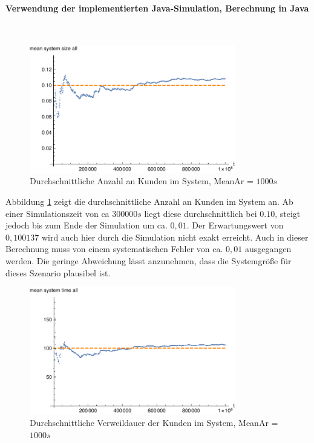 \paragraph{Verwendung der implementierten Java-Simulation, Berechnung in Java}
\label{JavaTwoPhones1000}
\\
\begin{figure}[htpb]
	\centering
	\includegraphics[width=0.8\textwidth]{abbildungen/2_Phone_VIP/Arrival_1000_Serve_100_dur_1000000_Skip_0/MeanSystemSizeAll.pdf}
	\caption{Durchschnittliche Anzahl an Kunden im System, MeanAr = $1000s$}
	\label{fig:mean3SystemSize1000}
\end{figure}

Abbildung \ref{fig:mean3SystemSize1000} zeigt die durchschnittliche Anzahl an Kunden im System an. Ab einer Simulationszeit von ca $300000s$ liegt diese durchschnittlich bei $0.10$, steigt jedoch bis zum Ende der Simulation um ca. $0,01$. Der Erwartungswert von $0,100137$ wird auch hier durch die Simulation nicht exakt erreicht. Auch in dieser Berechnung muss von einem systematischen Fehler von ca. $0,01$ ausgegangen werden. Die geringe Abweichung lässt anzunehmen, dass die Systemgröße für dieses Szenario plausibel ist.

\begin{figure}[htpb]
	\centering
	\includegraphics[width=0.8\textwidth]{abbildungen/2_Phone_VIP/Arrival_1000_Serve_100_dur_1000000_Skip_0/MeanSystemTimeAll.pdf}
	\caption{Durchschnittliche Verweildauer der Kunden im System, MeanAr = $1000s$}
	\label{fig:mean3SystemTime1000}
\end{figure}

